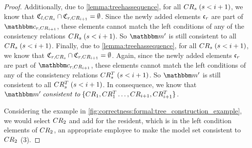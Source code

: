 \begin{proof}
    Additionally, due to \autoref{lemma:treehassequence}, for all  $CR_{s}\; (s < i+1)$, we know that $\mathfrak{C}_{l,CR_{s}} \cap \mathfrak{C}_{r,CR_{i+1}} = \emptyset$. 
    Since the newly added elements $\mathfrak{c}_{r}$ are part of $\condition{c}{r,\consistencyrelation{CR}{i+1}}$, these elements cannot match the left conditions of any of the consistency relations $CR_{s}\; (s < i+1)$.
    So $\modelset{m'}$ is still consistent to all $CR_{s}\; (s < i+1)$.
    Finally, due to \autoref{lemma:treehassequence}, for all  $CR_{s}\; (s < i+1)$, we know that $\mathfrak{C}_{r,CR_{s}} \cap \mathfrak{C}_{r,CR_{i+1}} = \emptyset$.
    Again, since the newly added elements $\mathfrak{c}_{r}$ are part of $\condition{c}{r,\consistencyrelation{CR}{i+1}}$, these elements cannot match the left conditions of any of the consistency relations $CR^T_{s}\; (s < i+1)$.
    So $\modelset{m'}$ is still consistent to all $CR^T_{s}\; (s < i+1)$.
    In consequence, we know that $\modelset{m'} \consistenttomath \setted{\consistencyrelation{CR}{1}, \consistencyrelation{CR^T}{1} \dots, \consistencyrelation{CR}{i+1}, \consistencyrelation{CR^T}{i+1}}$.
    
    Considering the example in \autoref{fig:correctness:formal:tree_construction_example}, we would select $CR_{2}$ and add for the resident, which is in the left condition elements of $CR_{2}$, an appropriate employee to make the model set consistent to $CR_{2}$ (3).
    

\end{proof}
